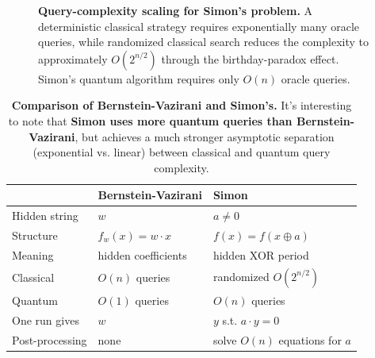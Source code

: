 \begin{figure}[htp]

    \caption{
        \textbf{Query-complexity scaling for Simon's problem.}
        A deterministic classical strategy requires exponentially many
        oracle queries, while randomized classical search reduces the
        complexity to approximately $O(2^{n/2})$ through the
        birthday-paradox effect. Simon's quantum algorithm requires only
        $O(n)$ oracle queries.
    }
    \label{fig:simon-query-complexity}
\end{figure}

\newpage

\begin{table}[!htp]
    \centering
    \begin{tabular}{@{} l l l @{}}
        \toprule
        & Bernstein-Vazirani & Simon \\
        \midrule
        Hidden string & $w$ & $a \neq 0$ \\[.3em]
        Structure & $f_w(x) = w \cdot x$ & $f(x) = f(x \oplus a)$ \\[.3em]
        Meaning & hidden coefficients & hidden XOR period \\[.3em]
        Classical & $O(n)$ queries & randomized $O(2^{n/2})$ \\[.3em]
        Quantum & $O(1)$ queries & $O(n)$ queries \\[.3em]
        One run gives & $w$ & $y$ s.t. $a \cdot y = 0$ \\[.3em]
        Post-processing & none & solve $O(n)$ equations for $a$ \\
        \bottomrule
    \end{tabular}
    \caption{
        \textbf{Comparison of Bernstein-Vazirani and Simon's.}
        It's interesting to note that \textbf{Simon uses more quantum queries than Bernstein-Vazirani},
        but achieves a much stronger asymptotic separation (exponential vs. linear)
        between classical and quantum query complexity.
    }
    \label{tab:simon-bernstein-vazirani}
\end{table}

